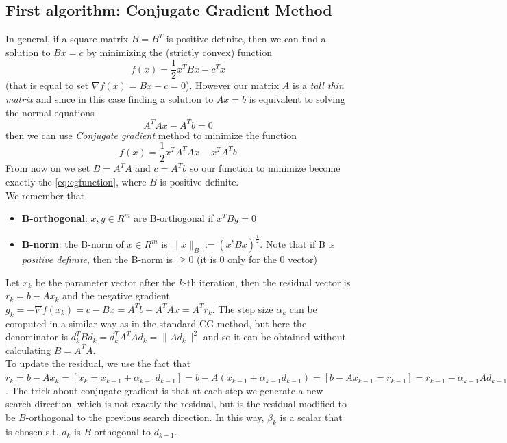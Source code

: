 \documentclass{article}
\begin{document}
\subsection{First algorithm: Conjugate Gradient Method}\label{subsec:conjugate-gradient-method}
In general, if a square matrix $B = B^{T}$ is positive definite, then we can find a solution to $Bx = c$ by minimizing the (strictly convex) function 
\[
f(x) = \frac{1}{2}x^{T}Bx - c^{T}x \tag{1} \label{eq:cgfunction}
\]
(that is equal to set $\nabla f(x) = Bx - c = 0$). However our matrix $A$ is a \emph{tall thin matrix} and since in this case finding a solution to  $Ax = b$ is equivalent to solving the normal equations
\[
A^{T}Ax - A^{T}b = 0
\]
then we can use \textit{Conjugate gradient} method to minimize the function
\[
f(x) = \frac{1}{2}x^{T}A^{T}Ax - x^{T}A^{T}b
\]
From now on we set $B = A^{T}A$ and $c = A^{T}b$ so our function to minimize become exactly the \eqref{eq:cgfunction}, where $B$ is positive definite. 
\\We remember that \begin{itemize}
\item \textbf{B-orthogonal}: $x, y \in R^{m}$ are B-orthogonal if $x^{T}By = 0$
\item \textbf{B-norm}: the B-norm of $x \in R^{m}$ is $\|x\|_{B} := (x^{t}Bx)^{\frac{1}{2}}$. Note that if B is \textit{positive definite}, then the B-norm is $\geq 0$ (it is $0$ only for the $0$ vector)
\end{itemize}
Let $x_{k}$ be the parameter vector after the $k$-th iteration, then the residual vector is $r_{k} = b - Ax_{k}$ and the negative gradient $g_{k} = -\nabla f(x_{k}) = c - Bx = A^{T}b - A^{T}Ax = A^{T}r_{k}$. The step size $\alpha_{k}$ can be computed in a similar way as in the standard CG method, but here the denominator is $d_{k}^{T}Bd_k= d_{k}^{T}A^{T}Ad_k = \|Ad_{k}\|^2$ and so it can be obtained without calculating $B = A^{T}A$.
\\To update the residual, we use the fact that $r_{k} = b - Ax_{k} = [x_{k} = x_{k-1} + \alpha_{k-1}d_{k-1}] = b - A(x_{k-1} + \alpha_{k-1}d_{k-1}) = [b-Ax_{k-1} = r_{k-1}] = r_{k-1} - \alpha_{k-1}Ad_{k-1}$. The trick about conjugate gradient is that at each step we generate a new search direction, which is not exactly the residual, but is the residual modified to be $B$-orthogonal to the previous search direction. In this way, $\beta_{k}$ is a scalar that is chosen s.t. $d_{k}$ is $B$-orthogonal to $d_{k-1}$.

\end{document}

